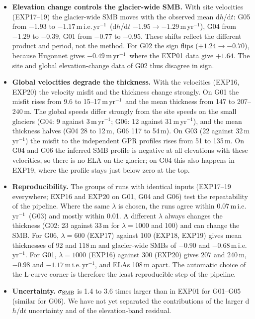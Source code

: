 \documentclass[10pt,a4paper]{article}
\newcommand{\myr}{m\,yr$^{-1}$}
\newcommand{\mie}{m\,i.e.\,yr$^{-1}$}
\begin{document}
\begin{itemize}\setlength{\itemsep}{1pt}
\item \textbf{Elevation change controls the glacier-wide SMB.} With site velocities (EXP17--19) the glacier-wide SMB moves with
the observed mean d$h$/d$t$: G05 from $-1.93$ to $-1.17$\,\mie\ (d$h$/d$t$ $-1.95\rightarrow-1.29$\,\myr), G04 from $-1.29$ to
$-0.39$, G01 from $-0.77$ to $-0.95$. These shifts reflect the different product and period, not the method. For G02 the
sign flips ($+1.24\rightarrow-0.70$), because Hugonnet gives $-0.49$\,\myr\ where the EXP01 data give $+1.64$. The site and global
elevation-change data of G02 thus disagree in sign.
\item \textbf{Global velocities degrade the thickness.} With the \citet{millan} velocities (EXP16, EXP20) the velocity misfit and the
thickness change strongly. On G01 the misfit rises from 9.6 to 15--17\,\myr\ and the mean thickness from 147 to 207--240\,m.
The global speeds differ strongly from the site speeds on the small glaciers (G04: 9 against 3\,\myr; G06: 12 against
31\,\myr), and the mean thickness halves (G04 28 to 12\,m, G06 117 to 54\,m). On G03 (22 against 32\,\myr) the misfit to the independent GPR profiles rises from 51 to 135\,m. On G04 and G06 the inferred SMB profile is
negative at all elevations with these velocities, so there is no ELA on the glacier; on G04 this also happens in EXP19,
where the profile stays just below zero at the top.
\item \textbf{Reproducibility.} The groups of runs with identical inputs (EXP17--19 everywhere; EXP16 and EXP20 on G01, G04
and G06) test the repeatability of the pipeline. Where the same $\lambda$ is chosen, the runs agree within 0.07\,\mie\
(G03) and mostly within 0.01. A different $\lambda$ always changes the thickness (G02: 23 against 33\,m for $\lambda=1000$
and 100) and can change the SMB. For G06, $\lambda=600$ (EXP17)
against 100 (EXP18, EXP19) gives mean thicknesses of 92 and 118\,m and glacier-wide SMBs of $-0.90$ and $-0.68$\,\mie. For
G01, $\lambda=1000$ (EXP16) against 300 (EXP20) gives 207 and 240\,m, $-0.98$ and $-1.17$\,\mie, and ELAs 108\,m apart. The
automatic choice of the L-curve corner is therefore the least reproducible step of the pipeline.
\item \textbf{Uncertainty.} $\sigma_{\rm SMB}$ is 1.4 to 3.6 times larger than in EXP01 for G01--G05 (similar for G06).
We have not yet separated the contributions of the larger d$h$/d$t$ uncertainty and of the elevation-band residual.
\end{itemize}
\end{document}
